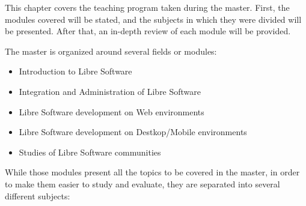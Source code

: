 This chapter covers the teaching program taken during the master. First, the modules
covered will be stated, and the subjects in which they were divided will be presented.
After that, an in-depth review of each module will be provided.

The master is organized around several fields or modules:

\begin{itemize}
\item Introduction to Libre Software
\item Integration and Administration of Libre Software
\item Libre Software development on Web environments
\item Libre Software development on Destkop/Mobile environments
\item Studies of Libre Software communities
\end{itemize}

While those modules present all the topics to be covered in the master, in order
to make them easier to study and evaluate, they are separated into several different subjects:

